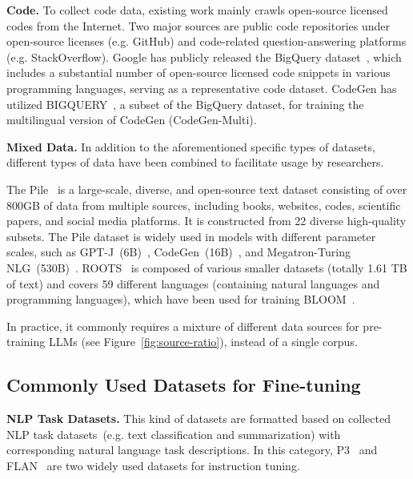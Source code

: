 \textbf{Code.} To collect code data, existing work mainly crawls open-source licensed codes from the Internet. Two major sources are public code repositories  under open-source licenses (e.g. GitHub) and code-related question-answering platforms (e.g. StackOverflow). {Google has publicly released the BigQuery dataset~\cite{bigquery-google}, which includes a substantial number of open-source licensed code snippets in various programming languages, serving as a representative code dataset. CodeGen has utilized BIGQUERY~\cite{nijkamp-arxiv-2022-Codegen}, a subset of the BigQuery dataset, for training the multilingual version of CodeGen (CodeGen-Multi).}

\textbf{Mixed Data.} In addition to the aforementioned specific types of datasets, different types of data have been combined to facilitate usage by researchers. 

The Pile~\cite{Gao-arxiv-2021-Pile} is a large-scale, diverse, and open-source text dataset consisting of over 800GB of data from multiple sources, including books, websites, codes, scientific papers, and social media platforms. It is constructed from 22 diverse high-quality subsets. The Pile dataset is widely used in models with different parameter scales, such as GPT-J~(6B)~\cite{Wang-GitHub-2021-GPT-J}, CodeGen~(16B)~\cite{nijkamp-arxiv-2022-Codegen}, and Megatron-Turing NLG~(530B)~\cite{Smith-CoRR-2022-Using}. ROOTS~\cite{Laurencon-NIPS-2022-The} is composed of various smaller datasets (totally 1.61 TB of text) and covers 59 different languages (containing natural languages and programming languages), which have been used for training BLOOM~\cite{Scao-arxiv-2022-BLOOM}.

In practice, it commonly requires a mixture of different data sources for pre-training LLMs (see Figure~\ref{fig:source-ratio}), instead of a single corpus.

\subsection{Commonly Used Datasets for Fine-tuning}
\label{sec:commonly_used_fituning}

\textbf{NLP Task Datasets.} {This kind of datasets are formatted based on collected NLP task datasets~(e.g. text classification and summarization) with corresponding natural language task descriptions. In this category, P3~\cite{Sanh-2022-ICLR-P3} and FLAN~\cite{Wei-ICLR-2022-Finetuned, Longpre-2023-arxiv-Flan_v2} are two widely used datasets for instruction tuning. }

